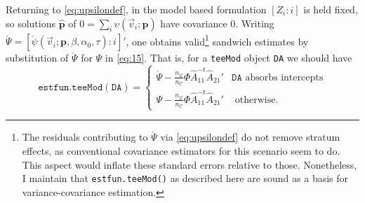 \documentclass{article}
\newcommand{\absorbInterceptsEF}{\upsilon}
\begin{document}
Returning to \eqref{eq:upsilondef}, in the model based formulation $[Z_{i}: i]$ is held fixed, so
solutions $\hat{\mathbf{p}}$ of
$0 = \sum_{i}\absorbInterceptsEF(\vec{v}_{i}; \mathbf{p})$ have
covariance 0.  Writing $\acute{\Psi} =
[\acute{\psi}(\vec{v}_{i}; \mathbf{p}, \beta, \alpha_{0}, \tau) : i]'$, one
obtains valid\footnote{%
The residuals contributing to $\acute{\Psi}$ via \eqref{eq:upsilondef} do not remove stratum
effects, as conventional covariance estimators for this scenario
seem to do.  This aspect would inflate these standard errors
relative to those. Nonetheless, I maintain that
\texttt{estfun.teeMod()} as described here are sound as a
basis for variance-covariance estimation.}
  sandwich estimates by substitution of $\acute{\Psi}$ for
$\Psi$ in \eqref{eq:15}.  That is, for a
\texttt{teeMod} object \texttt{DA} we should have
\begin{equation*}\label{eq:26}
\mathtt{estfun.teeMod(DA)} =
  \begin{cases}
  \acute{\Psi} -
  \frac{n_{\mathcal{Q}}}{n_{\mathcal{C}}}\Phi
  \hat{A}_{11}^{-t}\hat{A}_{21}'& \mathtt{DA} \text{ absorbs
    intercepts}\\
\Psi -
  \frac{n_{\mathcal{Q}}}{n_{\mathcal{C}}}\Phi
  \hat{A}_{11}^{-t}\hat{A}_{21}'  & \text{ otherwise}.
\end{cases}
\end{equation*}
\end{document}
